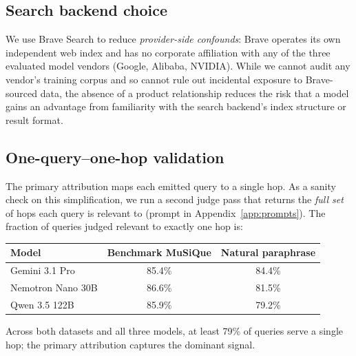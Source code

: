 \documentclass[10pt,letterpaper]{article}
\begin{document}
\subsection{Search backend choice}\label{app:operational:backend}
We use Brave Search to reduce \emph{provider-side confounds}: Brave operates its own
independent web index and has no corporate affiliation with any of the three evaluated
model vendors (Google, Alibaba, NVIDIA). While we cannot audit any vendor's training
corpus and so cannot rule out incidental exposure to Brave-sourced data, the absence of
a product relationship reduces the risk that a model gains an advantage from familiarity
with the search backend's index structure or result format.

\subsection{One-query--one-hop validation}\label{app:operational:oneone}
The primary attribution maps each emitted query to a single hop. As a sanity check on
this simplification, we run a second judge pass that returns the \emph{full set} of hops
each query is relevant to (prompt in Appendix~\ref{app:prompts}). The fraction of
queries judged relevant to exactly one hop is:

\begin{center}
\begin{tabular}{lcc}
\toprule
\textbf{Model} & \textbf{Benchmark MuSiQue} & \textbf{Natural paraphrase} \\
\midrule
Gemini 3.1 Pro     & 85.4\% & 84.4\% \\
Nemotron Nano 30B  & 86.6\% & 81.5\% \\
Qwen 3.5 122B      & 85.9\% & 79.2\% \\
\bottomrule
\end{tabular}
\end{center}

\noindent
Across both datasets and all three models, at least 79\% of queries serve a single hop;
the primary attribution captures the dominant signal.
\end{document}
